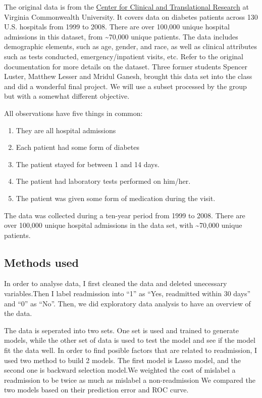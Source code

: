 \documentclass[]{article}
\providecommand{\tightlist}{%
  \setlength{\itemsep}{0pt}\setlength{\parskip}{0pt}}
\begin{document}
The original data is from the
\href{https://archive.ics.uci.edu/ml/datasets/Diabetes+130-US+hospitals+for+years+1999-2008}{Center
for Clinical and Translational Research} at Virginia Commonwealth
University. It covers data on diabetes patients across 130 U.S.
hospitals from 1999 to 2008. There are over 100,000 unique hospital
admissions in this dataset, from \textasciitilde{}70,000 unique
patients. The data includes demographic elements, such as age, gender,
and race, as well as clinical attributes such as tests conducted,
emergency/inpatient visits, etc. Refer to the original documentation for
more details on the dataset. Three former students Spencer Luster,
Matthew Lesser and Mridul Ganesh, brought this data set into the class
and did a wonderful final project. We will use a subset processed by the
group but with a somewhat different objective.

All observations have five things in common:

\begin{enumerate}
\def\labelenumi{\arabic{enumi}.}
\tightlist
\item
  They are all hospital admissions
\item
  Each patient had some form of diabetes
\item
  The patient stayed for between 1 and 14 days.
\item
  The patient had laboratory tests performed on him/her.
\item
  The patient was given some form of medication during the visit.
\end{enumerate}

The data was collected during a ten-year period from 1999 to 2008. There
are over 100,000 unique hospital admissions in the data set, with
\textasciitilde{}70,000 unique patients.

\subsection{Methods used}\label{methods-used}

In order to analyse data, I first cleaned the data and deleted
unecessary variables.Then I label readmission into ``1'' as ``Yes,
readmitted within 30 days'' and ``0'' as ``No''. Then, we did
exploratory data analysis to have an overview of the data.

The data is seperated into two sets. One set is used and trained to
generate models, while the other set of data is used to test the model
and see if the model fit the data well. In order to find posible factors
that are related to readmission, I used two method to build 2 models.
The first model is Lasso model, and the second one is backward selection
model.We weighted the cost of mislabel a readmission to be twice as much
as mislabel a non-readmission We compared the two models based on their
prediction error and ROC curve.
\end{document}
